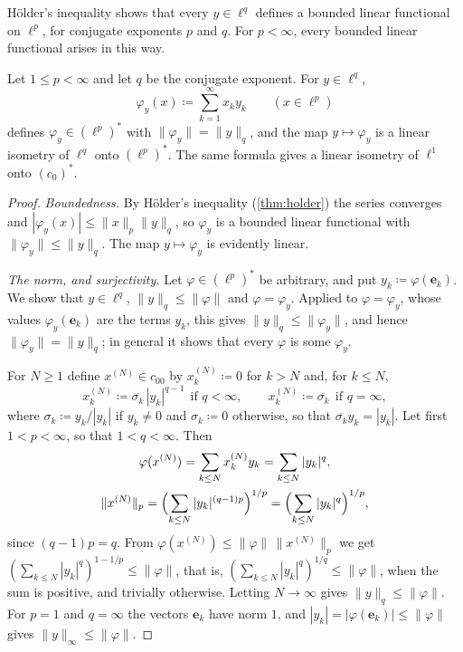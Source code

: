 H\"older's inequality shows that every $y\in\ell^q$ defines a bounded linear functional on $\ell^p$, for conjugate exponents $p$ and $q$. For $p<\infty$, every bounded linear functional arises in this way.

\begin{theorem}
\label{thm:lp-dual}
Let $1\le p<\infty$ and let $q$ be the conjugate exponent. For $y\in\ell^q$,
\[
\varphi_y(x)\coloneqq\sum_{k=1}^\infty x_ky_k\qquad(x\in\ell^p)
\]
defines $\varphi_y\in(\ell^p)^*$ with $\|\varphi_y\|=\|y\|_q$, and the map $y\mapsto\varphi_y$ is a linear isometry of $\ell^q$ onto $(\ell^p)^*$. The same formula gives a linear isometry of $\ell^1$ onto $(c_0)^*$.
\end{theorem}

\begin{proof}
\emph{Boundedness.} By H\"older's inequality (\cref{thm:holder}) the series converges and $|\varphi_y(x)|\le\|x\|_p\|y\|_q$, so $\varphi_y$ is a bounded linear functional with $\|\varphi_y\|\le\|y\|_q$. The map $y\mapsto\varphi_y$ is evidently linear.

\emph{The norm, and surjectivity.} Let $\varphi\in(\ell^p)^*$ be arbitrary, and put $y_k\coloneqq\varphi(\mathbf e_k)$. We show that $y\in\ell^q$, $\|y\|_q\le\|\varphi\|$ and $\varphi=\varphi_y$. Applied to $\varphi=\varphi_y$, whose values $\varphi_y(\mathbf e_k)$ are the terms $y_k$, this gives $\|y\|_q\le\|\varphi_y\|$, and hence $\|\varphi_y\|=\|y\|_q$; in general it shows that every $\varphi$ is some $\varphi_y$.

For $N\ge1$ define $x^{(N)}\in c_{00}$ by $x^{(N)}_k\coloneqq0$ for $k>N$ and, for $k\le N$,
\[
x^{(N)}_k\coloneqq\overline{\sigma_k}\,|y_k|^{q-1}\ \ \text{if }q<\infty,\qquad x^{(N)}_k\coloneqq\overline{\sigma_k}\ \ \text{if }q=\infty ,
\]
where $\sigma_k\coloneqq y_k/|y_k|$ if $y_k\ne0$ and $\sigma_k\coloneqq0$ otherwise, so that $\overline{\sigma_k}y_k=|y_k|$. Let first $1<p<\infty$, so that $1<q<\infty$. Then
\begin{gather*}
\varphi(x^{(N)})=\sum_{k\le N}x^{(N)}_ky_k=\sum_{k\le N}|y_k|^q,\\
\|x^{(N)}\|_p=\Bigl(\sum_{k\le N}|y_k|^{(q-1)p}\Bigr)^{1/p}=\Bigl(\sum_{k\le N}|y_k|^q\Bigr)^{1/p},
\end{gather*}
since $(q-1)p=q$. From $\varphi(x^{(N)})\le\|\varphi\|\,\|x^{(N)}\|_p$ we get $(\sum_{k\le N}|y_k|^q)^{1-1/p}\le\|\varphi\|$, that is, $(\sum_{k\le N}|y_k|^q)^{1/q}\le\|\varphi\|$, when the sum is positive, and trivially otherwise. Letting $N\to\infty$ gives $\|y\|_q\le\|\varphi\|$. For $p=1$ and $q=\infty$ the vectors $\mathbf e_k$ have norm $1$, and $|y_k|=|\varphi(\mathbf e_k)|\le\|\varphi\|$ gives $\|y\|_\infty\le\|\varphi\|$.


\end{proof}
